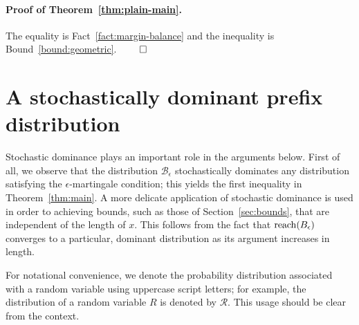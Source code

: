 \paragraph{Proof of Theorem~\ref{thm:plain-main}.}
The equality is Fact~\ref{fact:margin-balance} 
and the inequality is Bound~\ref{bound:geometric}. $\qed$





\section{A stochastically dominant prefix distribution}\label{sec:dominance-rho-stationary}

Stochastic dominance plays an important role in the arguments
below. First of all, we observe that the distribution
$\mathcal{B}_\epsilon$ stochastically dominates any distribution
satisfying the $\epsilon$-martingale condition; this yields the first
inequality in Theorem~\ref{thm:main}. A more delicate application of
stochastic dominance is used in order to achieving bounds, such as
those of Section~\ref{sec:bounds}, that are independent of the length of
$x$. This follows from the fact that $\operatorname{reach}(B_{\epsilon})$ converges to a
particular, dominant distribution as its argument increases in length.

For notational convenience, we denote
the probability distribution associated with a random variable using
uppercase script letters; for example, the distribution of a random
variable $R$ is denoted by $\mathcal{R}$.  This usage should be clear
from the context.


